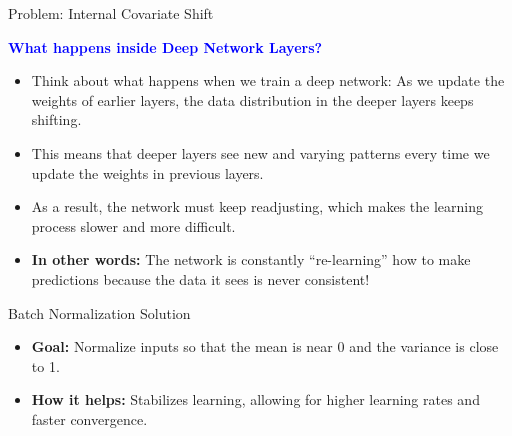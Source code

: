 \documentclass[serif, aspectratio=169]{beamer}
\begin{document}
\begin{frame}{Problem: Internal Covariate Shift}

\textcolor{blue}{\textbf{What happens inside Deep Network Layers?}}

\begin{itemize}

\item Think about what happens when we train a deep network: As we update the weights of earlier layers, the data distribution in the deeper layers keeps shifting.
\item This means that deeper layers see new and varying patterns every time we update the weights in previous layers.
\item As a result, the network must keep readjusting, which makes the learning process slower and more difficult.
\item \textbf{In other words:} The network is constantly “re-learning” how to make predictions because the data it sees is never consistent!

\end{itemize}

\end{frame}

\begin{frame}{Batch Normalization Solution}

    \begin{itemize}
        \item \textbf{Goal:} Normalize inputs so that the mean is near 0 and the variance is close to 1.
        \item \textbf{How it helps:} Stabilizes learning, allowing for higher learning rates and faster convergence.
    \end{itemize}

\end{frame}
\end{document}
